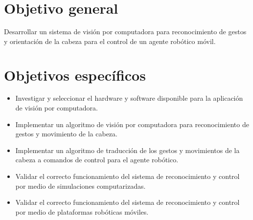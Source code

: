 
\section*{Objetivo general}
Desarrollar un sistema de visión por computadora para reconocimiento de gestos y orientación de la cabeza para el control de un agente robótico móvil.

\section*{Objetivos específicos}
\begin{itemize}
	\item Investigar y seleccionar el hardware y software disponible para la aplicación de visión por computadora.
	
	\item Implementar un algoritmo de visión por computadora para reconocimiento de gestos y movimiento de la cabeza.
	
	\item Implementar un algoritmo de traducción de los gestos y movimientos de la cabeza a comandos de control para el agente robótico.
	
	\item Validar el correcto funcionamiento del sistema de reconocimiento y control por medio de simulaciones computarizadas. 
	
	\item Validar el correcto funcionamiento del sistema de reconocimiento y control por medio de plataformas robóticas móviles. 
	
\end{itemize}